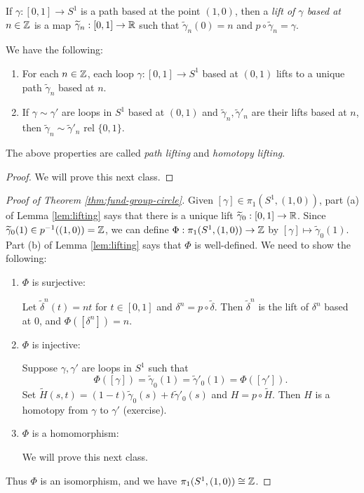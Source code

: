 \begin{definition}
  If $\gamma : [0, 1] \to S^1$ is a path based at
  the point $(1, 0)$, then a
  \emph{lift of $\gamma$ based at}
  $n \in \mathbb{Z}$ is a map $\widetilde{\gamma}_n : [0, 1] \to \mathbb{R}$
  such that $\widetilde{\gamma}_n(0) = n$ and
  $p \circ \widetilde{\gamma}_n = \gamma$.
\end{definition}

\begin{lemma}\label{lem:lifting}
  We have the following:
  \begin{enumerate}
    \item For each $n \in \mathbb{Z}$, each loop
      $\gamma : [0, 1] \to S^1$ based at $(0, 1)$
      lifts to a unique path $\widetilde{\gamma}_n$
      based at $n$.
    \item If $\gamma \sim \gamma'$ are loops in
      $S^1$ based at $(0, 1)$ and
      $\widetilde{\gamma}_n, \widetilde{\gamma}'_n$
      are their lifts based at $n$, then
      $\widetilde{\gamma}_n \sim \widetilde{\gamma}'_n$
      rel $\{0, 1\}$.
  \end{enumerate}
  The above properties are called \emph{path lifting}
  and \emph{homotopy lifting}.
\end{lemma}

\begin{proof}
  We will prove this next class.
\end{proof}

\begin{proof}[Proof of Theorem \ref{thm:fund-group-circle}]
  Given $[\gamma] \in \pi_1(S^1, (1, 0))$, part (a) of Lemma \ref{lem:lifting} says that there is a unique lift $\widetilde{\gamma}_0 : [0, 1] \to \mathbb{R}$.
  Since $\widetilde{\gamma}_0(1) \in p^{-1}((1, 0)) = \mathbb{Z}$,
  we can define $\Phi : \pi_1(S^1, (1, 0)) \to \mathbb{Z}$ by
  $[\gamma] \mapsto \widetilde{\gamma}_0(1)$.
  Part (b) of Lemma \ref{lem:lifting} says that $\Phi$ is
  well-defined. We need to show the following:
  \begin{enumerate}
    \item $\Phi$ is surjective:
      
      Let $\widetilde{\delta}^n(t) = nt$ for
      $t \in [0, 1]$ and $\delta^n = p \circ \widetilde{\delta}$.
      Then $\widetilde{\delta}^n$ is the lift of $\delta^n$ based at $0$, and
      $\Phi([\delta^n]) = n$.
    \item $\Phi$ is injective:

      Suppose $\gamma, \gamma'$ are loops in $S^1$
      such that
      \[
        \Phi([\gamma]) = \widetilde{\gamma}_0(1) = \widetilde{\gamma}'_0(1) = \Phi([\gamma']).
      \]
      Set $\widetilde{H}(s, t) = (1 - t) \widetilde{\gamma}_0(s) + t \widetilde{\gamma}'_0(s)$
      and $H = p \circ \widetilde{H}$. Then $H$ is a
      homotopy from $\gamma$ to $\gamma'$ (exercise).
    \item $\Phi$ is a homomorphism:

      We will prove this next class.
  \end{enumerate}
  Thus $\Phi$ is an isomorphism, and we have
  $\pi_1(S^1, (1, 0)) \cong \mathbb{Z}$.
\end{proof}
